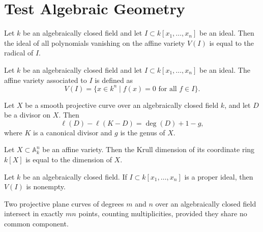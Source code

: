 \documentclass[lang=en,12pt]{beautybook}
\begin{document}
\section{Test Algebraic Geometry}

\begin{Proposition}\label{prop:2}
  Let $k$ be an algebraically closed field and let $I \subset k[x_1,\dots,x_n]$ be an ideal.
  Then the ideal of all polynomials vanishing on the affine variety $V(I)$ is equal to the radical of $I$.
\end{Proposition}

\begin{Definition}\label{defi:2}
  Let $k$ be an algebraically closed field and let $I \subset k[x_1,\dots,x_n]$ be an ideal.
  The affine variety associated to $I$ is defined as
  \[
    V(I) = \{ x \in k^n \mid f(x) = 0 \text{ for all } f \in I \}.
  \]
\end{Definition}

\begin{Theorem}\label{thm:2}
  Let $X$ be a smooth projective curve over an algebraically closed field $k$,
  and let $D$ be a divisor on $X$.
  Then
  \[
    \ell(D) - \ell(K - D) = \deg(D) + 1 - g,
  \]
  where $K$ is a canonical divisor and $g$ is the genus of $X$.
\end{Theorem}

\begin{Lemma}\label{Lemma:2}
  Let $X \subset \mathbb{A}^n_k$ be an affine variety.
  Then the Krull dimension of its coordinate ring $k[X]$ is equal to the dimension of $X$.
\end{Lemma}

\begin{Corollary}\label{Corollary:2}
  Let $k$ be an algebraically closed field.
  If $I \subset k[x_1,\dots,x_n]$ is a proper ideal, then $V(I)$ is nonempty.
\end{Corollary}

\begin{repitition}\label{repitition:2}
  Two projective plane curves of degrees $m$ and $n$ over an algebraically closed field
  intersect in exactly $mn$ points, counting multiplicities, provided they share no common component.
\end{repitition}
\end{document}
